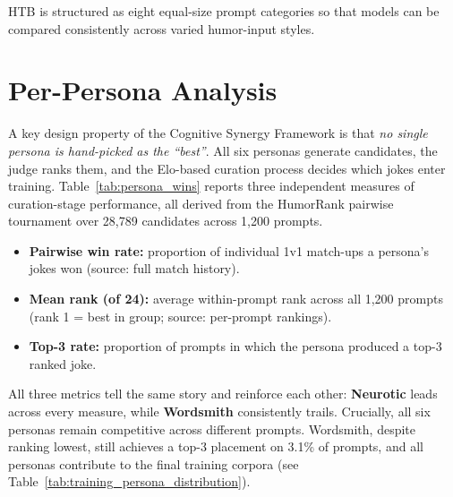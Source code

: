\documentclass[11pt]{article}
\begin{document}
HTB is structured as eight equal-size prompt categories so that models can be compared consistently across varied humor-input styles.

\newpage
\clearpage
\section{Per-Persona Analysis}
\label{sec:appendix_persona}

A key design property of the Cognitive Synergy Framework is that \textit{no single persona is hand-picked as the ``best''}. All six personas generate candidates, the judge ranks them, and the Elo-based curation process decides which jokes enter training. Table~\ref{tab:persona_wins} reports three independent measures of curation-stage performance, all derived from the HumorRank pairwise tournament over 28,789 candidates across 1,200 prompts.

\begin{itemize}
  \item \textbf{Pairwise win rate:} proportion of individual 1v1 match-ups a persona's jokes won (source: full match history).
  \item \textbf{Mean rank (of 24):} average within-prompt rank across all 1,200 prompts (rank 1 = best in group; source: per-prompt rankings).
  \item \textbf{Top-3 rate:} proportion of prompts in which the persona produced a top-3 ranked joke.
\end{itemize}

All three metrics tell the same story and reinforce each other: \textbf{Neurotic} leads across every measure, while \textbf{Wordsmith} consistently trails. Crucially, all six personas remain competitive across different prompts. Wordsmith, despite ranking lowest, still achieves a top-3 placement on 3.1\% of prompts, and all personas contribute to the final training corpora (see Table~\ref{tab:training_persona_distribution}).
\end{document}

